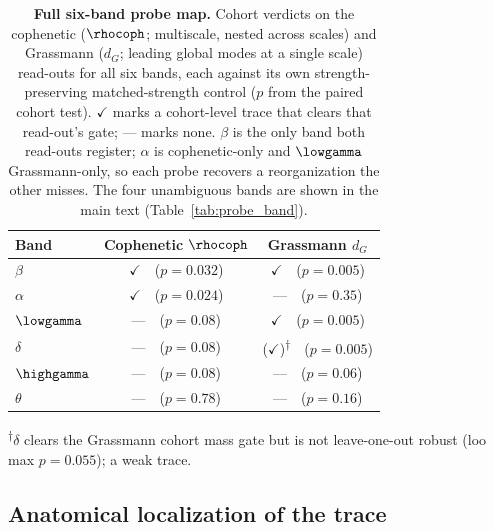 \begin{table}[t]
    \centering
    \caption{\textbf{Full six-band probe map.} Cohort verdicts on the cophenetic
      (\(\rhocoph\); multiscale, nested across scales) and Grassmann (\(d_{G}\); leading
      global modes at a single scale) read-outs for all six bands, each against its own
      strength-preserving matched-strength control (\(p\) from the paired cohort test).
      \(\checkmark\) marks a cohort-level trace that clears that read-out's gate; --- marks
      none. \(\beta\) is the only band both read-outs register; \(\alpha\) is
      cophenetic-only and \(\lowgamma\) Grassmann-only, so each probe recovers a
      reorganization the other misses. The four unambiguous bands are shown in the main
      text (Table~\ref{tab:probe_band}).}
    \label{tab:probe_band_full}
    \begin{tabular}{lcc}
        \toprule
        Band & Cophenetic \(\rhocoph\) & Grassmann \(d_{G}\) \\
        \midrule
        \(\beta\)      & \(\checkmark\)~~(\(p = 0.032\)) & \(\checkmark\)~~(\(p = 0.005\)) \\
        \(\alpha\)     & \(\checkmark\)~~(\(p = 0.024\)) & ---~~(\(p = 0.35\)) \\
        \(\lowgamma\)  & ---~~(\(p = 0.08\))            & \(\checkmark\)~~(\(p = 0.005\)) \\
        \(\delta\)     & ---~~(\(p = 0.08\))            & (\(\checkmark\))\textsuperscript{$\dagger$}~~(\(p = 0.005\)) \\
        \(\highgamma\) & ---~~(\(p = 0.08\))            & ---~~(\(p = 0.06\)) \\
        \(\theta\)     & ---~~(\(p = 0.78\))            & ---~~(\(p = 0.16\)) \\
        \bottomrule
    \end{tabular}

    \smallskip
    {\footnotesize \textsuperscript{$\dagger$}\(\delta\) clears the Grassmann cohort mass
    gate but is not leave-one-out robust (\gls{loo} max \(p = 0.055\)); a weak trace.}
\end{table}

\subsection{Anatomical localization of the trace}
\label{sssec:methods_anatomy}

